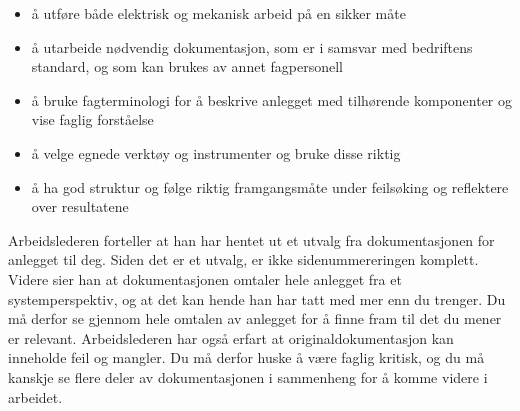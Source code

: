 \documentclass[12pt,a4paper]{article}
\begin{document}
\begin{itemize}
	\item å utføre både elektrisk og mekanisk arbeid på en sikker måte 
	\item å utarbeide nødvendig dokumentasjon, som er i samsvar med bedriftens standard, og som kan brukes av annet fagpersonell  
	\item å bruke fagterminologi for å beskrive anlegget med tilhørende komponenter og vise faglig forståelse  
	\item å velge egnede verktøy og instrumenter og bruke disse riktig 
	\item å ha god struktur og følge riktig framgangsmåte under feilsøking og reflektere over resultatene 
\end{itemize}
Arbeidslederen forteller at han har hentet ut et utvalg fra dokumentasjonen for anlegget til deg. Siden det er et utvalg, er ikke sidenummereringen komplett. Videre sier han at dokumentasjonen omtaler hele anlegget fra et systemperspektiv, og at det kan hende han har tatt med mer enn du trenger. Du må derfor se gjennom hele omtalen av anlegget for å finne fram til det du mener er relevant. Arbeidslederen har også erfart at originaldokumentasjon kan inneholde feil og mangler. Du må derfor huske å være faglig kritisk, og du må kanskje se flere deler av dokumentasjonen i sammenheng for å komme videre i arbeidet.








\newpage
\end{document}
